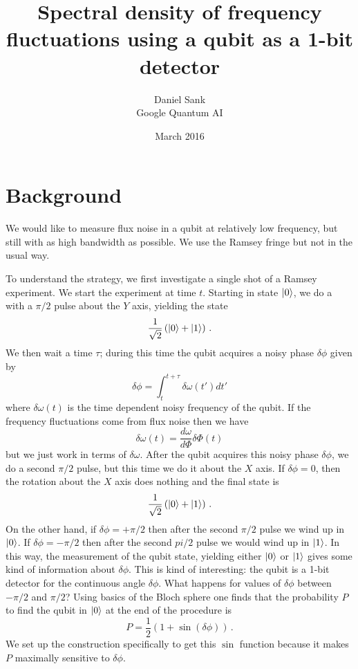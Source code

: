 \documentclass[twocolumn]{article}
\author{Daniel Sank \\ \small{Google Quantum AI}}
\title{Spectral density of frequency fluctuations using a qubit as a 1-bit detector}
\date{March 2016}
\begin{document}
\maketitle

\section{Background}

We would like to measure flux noise in a qubit at relatively low frequency, but still with as high bandwidth as possible.
We use the Ramsey fringe but not in the usual way.


To understand the strategy, we first investigate a single shot of a Ramsey experiment.
We start the experiment at time $t$.
Starting in state $| 0 \rangle$, we do a with a $\pi / 2$ pulse about the $Y$ axis, yielding the state
\begin{displaymath}
\frac{1}{\sqrt{2}} \left( | 0 \rangle + | 1 \rangle \right) \, .
\end{displaymath}
We then wait a time $\tau$; during this time the qubit acquires a noisy phase $\delta \phi$ given by
\begin{equation}
\delta \phi = \int_t^{t+\tau} \delta \omega(t') dt'
\end{equation}
where $\delta \omega(t)$ is the time dependent noisy frequency of the qubit.
If the frequency fluctuations come from flux noise then we have
\begin{equation}
\delta \omega(t) = \frac{d\omega}{d \Phi} \delta \Phi (t)
\end{equation}
but we just work in terms of $\delta \omega$.
After the qubit acquires this noisy phase $\delta \phi$, we do a second $\pi / 2$ pulse, but this time we do it about the $X$ axis.
If $\delta \phi = 0$, then the rotation about the $X$ axis does nothing and the final state is
\begin{equation}
\frac{1}{\sqrt{2}} \left( | 0 \rangle + | 1 \rangle \right) \, .
\end{equation}
On the other hand, if $\delta \phi = +\pi/2$ then after the second $\pi/2$ pulse we wind up in $| 0 \rangle$.
If $\delta \phi = -\pi/2$ then after the second $pi/2$ pulse we would wind up in $| 1 \rangle$.
In this way, the measurement of the qubit state, yielding either $| 0 \rangle$ or $| 1 \rangle$ gives some kind of information about $\delta \phi$.
This is kind of interesting: the qubit is a 1-bit detector for the continuous angle $\delta \phi$.
What happens for values of $\delta \phi$ between $-\pi / 2$ and $\pi / 2$?
Using basics of the Bloch sphere one finds that the probability $P$ to find the qubit in $| 0 \rangle$ at the end of the procedure is
\begin{equation}
P = \frac{1}{2} \left( 1 + \sin (\delta \phi) \right) \, .
\end{equation}
We set up the construction specifically to get this $\sin$ function because it makes $P$ maximally sensitive to $\delta \phi$.
\end{document}
